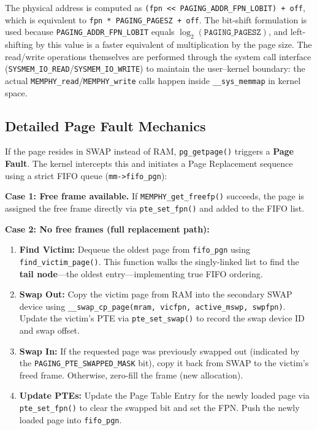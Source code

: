 \begin{theorybox}
The physical address is computed as \texttt{(fpn << PAGING\_ADDR\_FPN\_LOBIT) + off}, which is equivalent to \texttt{fpn * PAGING\_PAGESZ + off}. The bit-shift formulation is used because \texttt{PAGING\_ADDR\_FPN\_LOBIT} equals $\log_2(\texttt{PAGING\_PAGESZ})$, and left-shifting by this value is a faster equivalent of multiplication by the page size. The read/write operations themselves are performed through the system call interface (\texttt{SYSMEM\_IO\_READ}/\texttt{SYSMEM\_IO\_WRITE}) to maintain the user--kernel boundary: the actual \texttt{MEMPHY\_read}/\texttt{MEMPHY\_write} calls happen inside \texttt{\_\_sys\_memmap} in kernel space.
\end{theorybox}

\subsection{Detailed Page Fault Mechanics}
If the page resides in SWAP instead of RAM, \texttt{pg\_getpage()} triggers a \textbf{Page Fault}. The kernel intercepts this and initiates a Page Replacement sequence using a strict FIFO queue (\texttt{mm->fifo\_pgn}):

\textbf{Case 1: Free frame available.} If \texttt{MEMPHY\_get\_freefp()} succeeds, the page is assigned the free frame directly via \texttt{pte\_set\_fpn()} and added to the FIFO list.

\textbf{Case 2: No free frames (full replacement path):}
\begin{enumerate}
    \item \textbf{Find Victim:} Dequeue the oldest page from \texttt{fifo\_pgn} using \texttt{find\_victim\_page()}. This function walks the singly-linked list to find the \textbf{tail node}---the oldest entry---implementing true FIFO ordering.
    \item \textbf{Swap Out:} Copy the victim page from RAM into the secondary SWAP device using \texttt{\_\_swap\_cp\_page(mram, vicfpn, active\_mswp, swpfpn)}. Update the victim's PTE via \texttt{pte\_set\_swap()} to record the swap device ID and swap offset.
    \item \textbf{Swap In:} If the requested page was previously swapped out (indicated by the \texttt{PAGING\_PTE\_SWAPPED\_MASK} bit), copy it back from SWAP to the victim's freed frame. Otherwise, zero-fill the frame (new allocation).
    \item \textbf{Update PTEs:} Update the Page Table Entry for the newly loaded page via \texttt{pte\_set\_fpn()} to clear the swapped bit and set the FPN. Push the newly loaded page into \texttt{fifo\_pgn}.
\end{enumerate}

